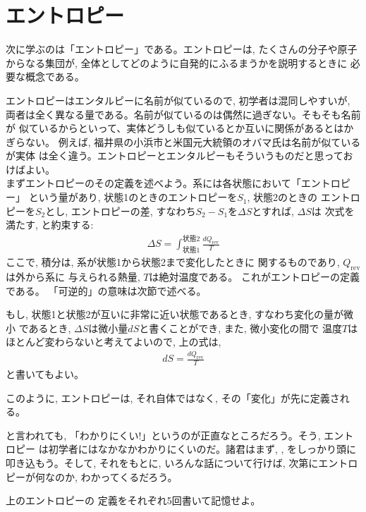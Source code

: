\section{エントロピー}

次に学ぶのは「エントロピー」である。エントロピーは, たくさんの分子や原子
からなる集団が, 全体としてどのように自発的にふるまうかを説明するときに
必要な概念である。

エントロピーはエンタルピーに名前が似ているので, 初学者は混同しやすいが, 
両者は全く異なる量である。名前が似ているのは偶然に過ぎない。そもそも名前が
似ているからといって、実体どうしも似ているとか互いに関係があるとはかぎらない。
例えば, 福井県の小浜市と米国元大統領のオバマ氏は名前が似ているが実体
は全く違う。エントロピーとエンタルピーもそういうものだと思っておけばよい。\\

まずエントロピーのその定義を述べよう。系には各状態において「エントロピー」
という量があり, 状態1のときのエントロピーを$S_1$, 状態2のときの
エントロピーを$S_2$とし, 
エントロピーの差, すなわち$S_2-S_1$を$\Delta S$とすれば, $\Delta S$は
次式を満たす, と約束する: 
\begin{eqnarray}
\Delta S=\int_{\text{状態1}}^{\text{状態2}} \frac{dQ_{\text{rev}}}{T}\label{eq:def_entropy}
\end{eqnarray}
ここで, 積分は, 系が状態1から状態2まで変化したときに
関するものであり, $Q_{\text{rev}}$は外から系に
与えられる熱量, $T$は絶対温度である。 これがエントロピーの定義である。
「可逆的」の意味は次節で述べる。

もし, 状態1と状態2が互いに非常に近い状態であるとき, すなわち変化の量が微小
であるとき, $\Delta S$は微小量$dS$と書くことができ, また, 微小変化の間で
温度$T$はほとんど変わらないと考えてよいので, 上の式は, 
\begin{eqnarray}
dS=\frac{dQ_{\text{rev}}}{T}\label{eq:def_entropy2}
\end{eqnarray}
と書いてもよい。

このように, エントロピーは, それ自体ではなく, その「変化」が先に定義される。

と言われても, 「わかりにくい!」というのが正直なところだろう。そう, エントロピー
は初学者にはなかなかわかりにくいのだ。諸君はまず, , 
をしっかり頭に叩き込もう。そして, それをもとに, いろんな話について行けば, 
次第にエントロピーが何なのか, わかってくるだろう。
\hv

\begin{q}\label{q:def_enthalpy} 上のエントロピーの
定義をそれぞれ5回書いて記憶せよ。\end{q}\mv


